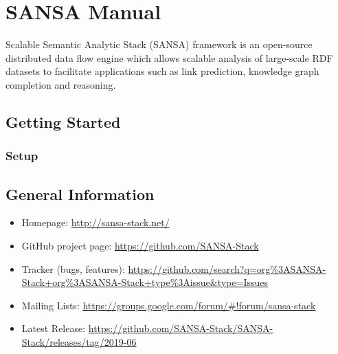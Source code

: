 \chapter{SANSA Manual}
\label{sec:appendix-sansa-manual}

Scalable Semantic Analytic Stack (SANSA) framework is an open-source distributed data flow engine which allows scalable analysis of large-scale RDF datasets to facilitate applications such as link prediction, knowledge graph completion and reasoning. 

\section{Getting Started}
\subsection{Setup}


\section{General Information}
\begin{itemize}
    \item Homepage: \url{http://sansa-stack.net/}
    \item GitHub project page: \url{https://github.com/SANSA-Stack}
    \item Tracker (bugs, features): \url{https://github.com/search?q=org\%3ASANSA-Stack+org\%3ASANSA-Stack+type\%3Aissue&type=Issues}
    \item Mailing Lists: \url{https://groups.google.com/forum/#!forum/sansa-stack}
    \item Latest Release: \url{https://github.com/SANSA-Stack/SANSA-Stack/releases/tag/2019-06}
\end{itemize}
